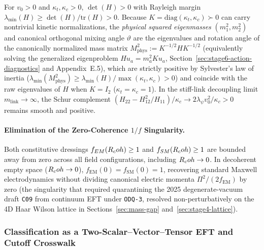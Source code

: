 For $v_0 > 0$ and $\kappa_t, \kappa_c > 0$, $\det(H) > 0$ with Rayleigh margin $\lambda_{\min}(H) \ge \det(H)/\mathrm{tr}(H) > 0$. Because $K = \mathrm{diag}(\kappa_t, \kappa_c) \succ 0$ can carry nontrivial kinetic normalizations, the \emph{physical squared eigenmasses} $(m_1^2, m_2^2)$ and canonical orthogonal mixing angle $\vartheta$ are the eigenvalues and rotation angle of the canonically normalized mass matrix $M_{\mathrm{phys}}^2 := K^{-1/2} H K^{-1/2}$ (equivalently solving the generalized eigenproblem $H u_a = m_a^2 K u_a$, Section~\ref{sec:stage6-action-diagnostics} and Appendix~E.5), which are strictly positive by Sylvester's law of inertia ($\lambda_{\min}(M_{\mathrm{phys}}^2) \ge \lambda_{\min}(H)/\max(\kappa_t, \kappa_c) > 0$) and coincide with the raw eigenvalues of $H$ when $K = I_2$ ($\kappa_t = \kappa_c = 1$). In the stiff-link decoupling limit $m_{\mathrm{link}} \to \infty$, the Schur complement $(H_{22} - H_{12}^2/H_{11})/\kappa_c \to 2\lambda_\psi v_0^2/\kappa_c > 0$ remains smooth and positive.

\paragraph{Elimination of the Zero-Coherence $1/f$ Singularity.}
Both constitutive dressings $f_{EM}(R_coh) \ge 1$ and $f_{SM}(R_coh) \ge 1$ are bounded away from zero across all field configurations, including $R_coh \to 0$. In decoherent empty space ($R_coh \to 0$), $f_{\mathrm{EM}}(0) = f_{\mathrm{SM}}(0) = 1$, recovering standard Maxwell electrodynamics without dividing canonical electric momenta $\Pi^2/(2f_{\mathrm{EM}})$ by zero (the singularity that required quarantining the 2025 degenerate-vacuum draft \texttt{C09} from continuum EFT under \texttt{ODQ-3}, resolved non-perturbatively on the 4D Haar Wilson lattice in Sections~\ref{sec:mass-gap} and~\ref{sec:stage4-lattice}).

\subsubsection{Classification as a Two-Scalar--Vector--Tensor EFT and Cutoff Crosswalk}

